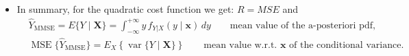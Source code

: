 \begin{itemize}
\begin{align*}
\hat{Y}_{\text{MMSE}}
&= E\{Y \mid \mathbf{X}\}
 = E_{Y|X}\{Y\}
 \equiv \eta_{Y|X}
 \qquad \text{(mean value of the a-posteriori pdf of } Y\text{)} \\[8pt]
E\{Y - \hat{Y}_{\text{MMSE}}\}
&= E_{Y,X}\{Y - \hat{Y}_{\text{MMSE}}\}
 = E_{Y,X}\{Y\} - E_{Y,X}\{\hat{Y}_{\text{MMSE}}\} \\[2pt]
&= E_Y\{Y\} - E_X\{ E_{Y|X}\{Y\} \}
 = \eta_Y - E_{Y,X}\{Y\}
 = \eta_Y - \eta_Y = 0
 \quad \Rightarrow \quad \text{unbiased}. \\[10pt]
\operatorname{MSE}\{\hat{Y}_{\text{MMSE}}\}
&= E\bigl\{(Y - \hat{Y}_{\text{MMSE}})^{2}\bigr\}
 = E\bigl\{(Y - E_{Y|X}\{Y\})^{2}\bigr\} \\[2pt]
&= E_{Y,X}\bigl\{(Y - \eta_{Y|X})^{2}\bigr\}
 = E_X\!\left\{ E_{Y|X}\bigl\{(Y - \eta_{Y|X})^{2}\bigr\} \right\} \\[2pt]
&= E_X\{\sigma_{Y|X}^{2}\}
 \quad \Rightarrow \quad \text{mean value of the conditional variance}.
\end{align*}

\item In summary, for the quadratic cost function we get: \(R=MSE\) and 
\begin{align*}
&\hat{Y}_{\text{MMSE}}
= E\{Y \mid \mathbf{X}\}
 = \int_{-\infty}^{+\infty}
   y \, f_{Y|X}(y \mid \mathbf{x}) \, dy
 \qquad \text{mean value of the a-posteriori pdf}, \\[6pt]
&\operatorname{MSE}\{\hat{Y}_{\text{MMSE}}\}
= E_X\!\left\{ \operatorname{var}\{Y \mid \mathbf{X}\} \right\}
 \qquad \text{mean value w.r.t. } \mathbf{x} \text{ of the conditional variance}.
\end{align*}


\end{itemize}
